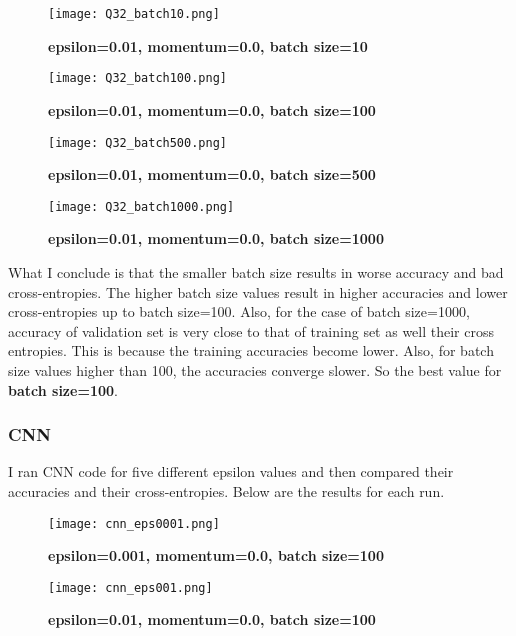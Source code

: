 \documentclass[10pt]{article}
\begin{document}
\begin{figure}[H]
	\centering
	\texttt{[image: Q32\_batch10.png]}
	\caption{\textbf{epsilon=0.01, momentum=0.0, batch size=10}}
	\label{fig:Q32_batch10}
\end{figure}

\begin{figure}[H]
	\centering
	\texttt{[image: Q32\_batch100.png]}
	\caption{\textbf{epsilon=0.01, momentum=0.0, batch size=100}}
	\label{fig:Q32_batch10}
\end{figure}

\begin{figure}[H]
	\centering
	\texttt{[image: Q32\_batch500.png]}
	\caption{\textbf{epsilon=0.01, momentum=0.0, batch size=500}}
	\label{fig:Q32_batch10}
\end{figure}

\begin{figure}[H]
	\centering
	\texttt{[image: Q32\_batch1000.png]}
	\caption{\textbf{epsilon=0.01, momentum=0.0, batch size=1000}}
	\label{fig:Q32_batch10}
\end{figure}

What I conclude is that the smaller batch size results in worse accuracy and bad cross-entropies. The higher batch size values result in higher accuracies and lower cross-entropies up to batch size=100. Also, for the case of batch size=1000, accuracy of validation set is very close to that of training set as well their cross entropies. This is because the training accuracies become lower. Also, for batch size values higher than 100, the accuracies converge slower. So the best value for \textbf{batch size=100}.

\subsubsection*{CNN}
I ran CNN code for five different epsilon values and then compared their accuracies and their cross-entropies. Below are the results for each run.
\begin{figure}[H]
	\centering
	\texttt{[image: cnn\_eps0001.png]}
	\caption{\textbf{epsilon=0.001, momentum=0.0, batch size=100}}
	\label{fig:Q32_batch10}
\end{figure}


\begin{figure}[H]
	\centering
	\texttt{[image: cnn\_eps001.png]}
	\caption{\textbf{epsilon=0.01, momentum=0.0, batch size=100}}
	\label{fig:}
\end{figure}
\end{document}
